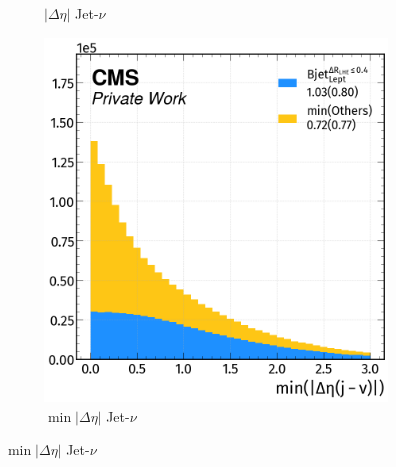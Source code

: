 \begin{figure}[H]
\begin{subfigure}{0.49\linewidth}
        \caption{$|\Delta \eta|$ Jet-$\nu$}
    \end{subfigure}
    \hfill
    \begin{subfigure}{0.4825\linewidth}  
        \centering
        \includegraphics[width=1\linewidth]{fig//chap08-kin_reco/min_deta_nu.png}
        \caption{$\min|\Delta \eta|$ Jet-$\nu$}
    \end{subfigure}  
\end{figure}
\newpage
